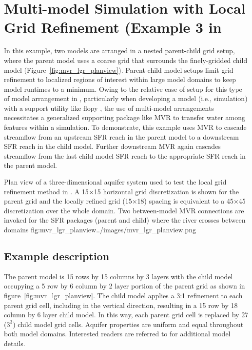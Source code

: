 \section{Multi-model Simulation with Local Grid Refinement (Example 3 in \cite{mehl2013}}


In this example, two models are arranged in a nested parent-child grid setup, where the parent model uses a coarse grid that surrounds the finely-gridded child model (Figure~\ref{fig:mvr_lgr_planview}).  Parent-child model setups limit grid refinement to localized regions of interest within large model domains to keep model runtimes to a minimum.  Owing to the relative ease of setup for this type of model arrangement in \mf, particularly when developing a model (i.e., simulation) with a support utility like flopy \citep{bakker2016}, the use of multi-model arrangements necessitates a generalized supporting package like MVR to transfer water among features within a simulation.  To demonstrate, this example uses MVR to cascade streamflow from an upstream SFR reach in the parent model to a downstream SFR reach in the child model.  Further downstream MVR again cascades streamflow from the last child model SFR reach to the appropriate SFR reach in the parent model.  

\begin{StandardFigure}
	{Plan view of a three-dimensional aquifer system used to test the local grid refinement method in \mf. A 15$\times$15 horizontal grid discretization is shown for the parent grid and the locally refined grid (15$\times$18) spacing is equivalent to a 45$\times$45 discretization over the whole domain.  Two between-model MVR connections are invoked for the SFR packages (parent and child) where the river crosses between domains}
	{fig:mvr_lgr_planview}{../images/mvr_lgr_planview.png}
\end{StandardFigure}

\subsection{Example description}

The parent model is 15 rows by 15 columns by 3 layers with the child model occupying a 5 row by 6 column by 2 layer portion of the parent grid as shown in figure~\ref{fig:mvr_lgr_planview}.  The child model applies a 3:1 refinement to each parent grid cell, including in the vertical direction, resulting in a 15 row by 18 column by 6 layer child model.  In this way, each parent grid cell is replaced by 27 ($3^3$) child model grid cells.  Aquifer properties are uniform and equal throughout both model domains.  Interested readers are referred to \cite{mehl2013} for additional model details.  

